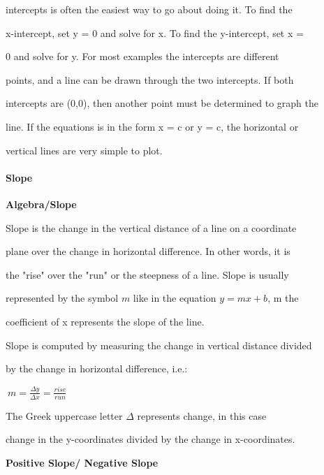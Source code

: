 intercepts is often the easiest way to go about doing it. To find the

x-intercept, set y = 0 and solve for x. To find the y-intercept, set x =

0 and solve for y. For most examples the intercepts are different

points, and a line can be drawn through the two intercepts. If both

intercepts are (0,0), then another point must be determined to graph the

line. If the equations is in the form x = c or y = c, the horizontal or

vertical lines are very simple to plot.



\paragraph{Slope}



\textbf{Algebra/Slope}



Slope is the change in the vertical distance of a line on a coordinate

plane over the change in horizontal difference. In other words, it is

the "rise" over the "run" or the steepness of a line. Slope is usually

represented by the symbol $m$ like in the equation $y = mx + b$, m the

coefficient of x represents the slope of the line.



Slope is computed by measuring the change in vertical distance divided

by the change in horizontal difference, i.e.:







$\ m = \frac{\Delta y}{\Delta x} = \frac{rise}{run}$







The Greek uppercase letter $\Delta$ represents change, in this case

change in the y-coordinates divided by the change in x-coordinates.



\textbf{Positive Slope/ Negative Slope}



